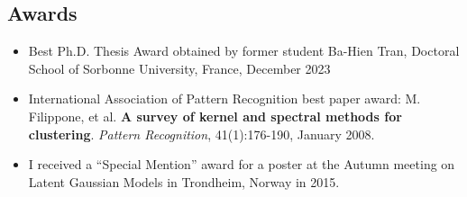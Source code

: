 \documentclass[oneside, a4paper, onecolumn, 10pt]{article}
\begin{document}

\subsection*{Awards}
\begin{itemize}
     \item Best Ph.D. Thesis Award obtained by former student Ba-Hien Tran, Doctoral School of Sorbonne University, France, December 2023
     \item 
International Association of Pattern Recognition best paper award: 
       M. Filippone, et al. %
       \textbf{A survey of kernel and spectral methods for clustering}.
       \emph{Pattern Recognition}, 41(1):176-190, January 2008.
\item I received a ``Special Mention'' award for a poster at the Autumn meeting on Latent Gaussian Models in Trondheim, Norway in 2015. 
\end{itemize}



\end{document}

